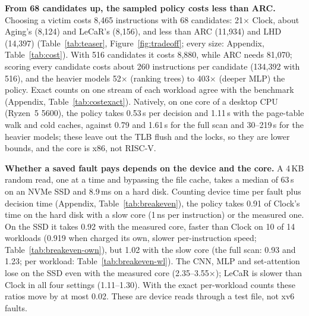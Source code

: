 \documentclass{article}
\newcommand{\clock}{Clock\xspace}
\newcommand{\finding}[1]{\textbf{#1}\hspace{0.4em}}
\begin{document}
\finding{From 68 candidates up, the sampled policy costs less than ARC.} Choosing a victim costs
8,465 instructions with 68 candidates: 21$\times$ \clock, about Aging's (8,124) and LeCaR's
(8,156), and less than ARC (11,934) and LHD (14,397) (Table~\ref{tab:teaser},
Figure~\ref{fig:tradeoff}; every size: Appendix, Table~\ref{tab:cost}). With 516
candidates it costs 8,880, while ARC needs 81,070; scoring every candidate costs about 260
instructions per candidate (134,392 with 516), and the heavier models 52$\times$ (ranking
trees) to 403$\times$ (deeper MLP) the policy. Exact counts on one stream of each
workload agree with the benchmark (Appendix, Table~\ref{tab:costexact}). Natively, on one
core of a desktop CPU (Ryzen~5 5600), the policy takes 0.53\,\textmu s per decision and
1.11\,\textmu s with the page-table walk and cold caches, against 0.79 and 1.61\,\textmu s
for the full scan and 30--219\,\textmu s for the heavier models; these leave out the TLB
flush and the locks, so they are lower bounds, and the core is x86, not RISC-V.

\finding{Whether a saved fault pays depends on the device and the core.} A 4\,KB random
read, one at a time and bypassing the file cache, takes a median of 63\,\textmu s on an
NVMe SSD and 8.9\,ms on a hard disk. Counting device time per fault plus decision time
(Appendix, Table~\ref{tab:breakeven}), the policy takes 0.91 of \clock's time on the hard
disk with a slow core (1\,ns per instruction) or the measured one. On the SSD it takes
0.92 with the measured core, faster than \clock on 10 of 14 workloads (0.919 when charged
its own, slower per-instruction speed; Table~\ref{tab:breakeven-own}), but 1.02 with the
slow core (the full scan: 0.93 and 1.23; per workload: Table~\ref{tab:breakeven-wl}). The
CNN, MLP and set-attention lose on the SSD
even with the measured core (2.35--3.55$\times$); LeCaR is slower than \clock in all four
settings (1.11--1.30). With the exact per-workload counts these ratios move by at most
0.02. These are device reads through a test file, not xv6 faults.
\end{document}
